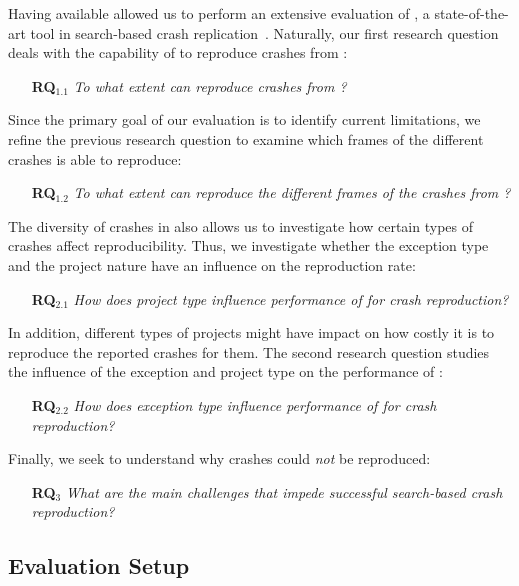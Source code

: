 
Having \crashpack available allowed us to perform an extensive evaluation of \evocrash, a state-of-the-art tool in search-based crash replication~\cite{Soltani2018a}.
Naturally, our first research question deals with the capability of \evocrash to reproduce crashes from \crashpack: 
%
\begin{itemize}
    \item[\textbf{RQ$_{1.1}$}] \textit{To what extent can \evocrash reproduce crashes from \crashpack?}
\end{itemize}
%
Since the primary goal of our evaluation is to identify current limitations, we refine the previous research question to examine which frames of the different crashes \evocrash is able to reproduce:
%
\begin{itemize}
    \item[\textbf{RQ$_{1.2}$}] \textit{To what extent can \evocrash reproduce the different frames of the crashes from \crashpack?}
\end{itemize}
%
The diversity of crashes in \crashpack also allows us to investigate how certain types of crashes affect reproducibility.
Thus, we investigate whether the exception type and  the project nature have an influence on the reproduction rate:
\begin{itemize}
   \item[\textbf{RQ$_{2.1}$}] \textit{How does project type influence performance of \evocrash for crash reproduction?}
\end{itemize}
In addition, different types of projects might have impact on how costly it is to reproduce the reported crashes for them.
The second research question studies the influence of the exception and project type on the performance of \evocrash:
%
\begin{itemize}
   \item[\textbf{RQ$_{2.2}$}] \textit{How does exception type influence performance of \evocrash for crash reproduction?}
\end{itemize}
%
Finally, we seek to understand why crashes could \emph{not} be reproduced:
%
\begin{itemize}
    \item[\textbf{RQ$_3$}] \textit{What are the main challenges that impede successful search-based crash reproduction?}
\end{itemize}

\subsection{Evaluation Setup}
\label{se:evalsetup}

